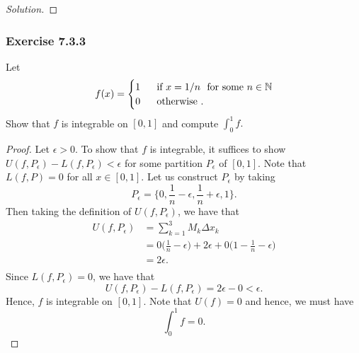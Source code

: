 \begin{enumerate}
\begin{proof}[Solution]
		\end{proof}
\end{enumerate}


\subsubsection{Exercise 7.3.3} Let 
\[  f(x) = 
\begin{cases}
	1 \ &\text{ if } x = 1 / n \ \text{ for some } n \in \mathbb{N} \\
	0 \ &\text{ otherwise }.
\end{cases}  \]
Show that \( f  \) is integrable on \( [0,1]  \) and compute \( \int_{ 0 }^{ 1 }  f . \)
\begin{proof}
	Let \( \epsilon > 0  \). To show that \( f  \) is integrable, it suffices to show \( U(f, P_{\epsilon }) - L(f, P_{\epsilon }) < \epsilon  \) for some partition \( P_{\epsilon } \) of \( [0,1] \). Note that \( L(f, P ) = 0  \) for all \( x \in [0,1] \). Let us construct \( P_{\epsilon } \) by taking 
	\[  P_{\epsilon } = \Big\{ 0 , \frac{ 1 }{ n } - \epsilon , \frac{ 1 }{ n }  + \epsilon , 1  \Big\}. \]
	Then taking the definition of \( U(f,P_{\epsilon })  \), we have that 
	\begin{align*}
	    U(f,P_{\epsilon }) &= \sum_{ k=1 }^{ 3 } M_{k } \Delta x_{k }   \\
						   &= 0 \Big( \frac{ 1 }{ n }  - \epsilon \Big) + 2 \epsilon  + 0 \Big( 1 - \frac{ 1 }{ n } - \epsilon  \Big) \\
						   &= 2 \epsilon. \\
	\end{align*}
	Since \( L(f, P_{\epsilon }) = 0  \), we have that 
	\[  U(f, P_{\epsilon }) - L(f, P_{\epsilon }) = 2 \epsilon - 0  < \epsilon.  \]
	Hence, \( f  \) is integrable on \( [0,1] \). Note that \( U(f) = 0  \) and hence, we must have 
	\[  \int_{ 0 }^{ 1 } f = 0. \]
\end{proof}

